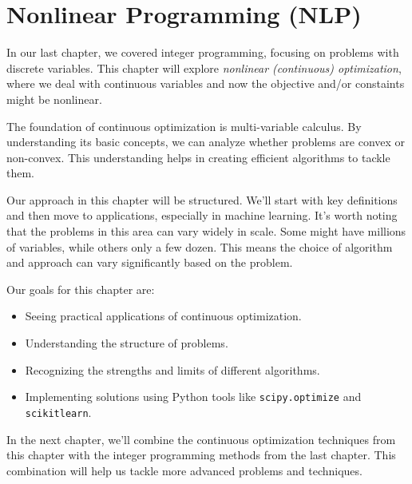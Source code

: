 

%
%
\chapter{Nonlinear Programming (NLP)}

In our last chapter, we covered integer programming, focusing on problems with discrete variables. This chapter will explore \textit{nonlinear (continuous) optimization}, where we deal with continuous variables and now the objective and/or constaints might be nonlinear.

The foundation of continuous optimization is multi-variable calculus. By understanding its basic concepts, we can analyze whether problems are convex or non-convex. This understanding helps in creating efficient algorithms to tackle them.

Our approach in this chapter will be structured. We'll start with key definitions and then move to applications, especially in machine learning. It's worth noting that the problems in this area can vary widely in scale. Some might have millions of variables, while others only a few dozen. This means the choice of algorithm and approach can vary significantly based on the problem.

Our goals for this chapter are:
\begin{itemize}
    \item Seeing practical applications of continuous optimization.
    \item Understanding the structure of problems.
    \item Recognizing the strengths and limits of different algorithms.
    \item Implementing solutions using Python tools like \texttt{scipy.optimize} and \texttt{scikitlearn}.
\end{itemize}

In the next chapter, we'll combine the continuous optimization techniques from this chapter with the integer programming methods from the last chapter. This combination will help us tackle more advanced problems and techniques.

